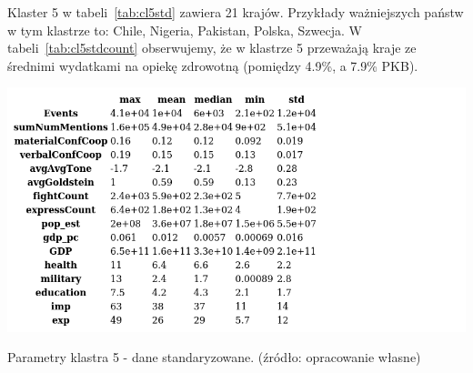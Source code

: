 \documentclass[11pt]{report}
\begin{document}
    Klaster 5 w tabeli~\ref{tab:cl5std} zawiera 21 krajów.
    Przykłady ważniejszych państw w tym klastrze to: Chile, Nigeria, Pakistan, Polska, Szwecja.
    W tabeli~\ref{tab:cl5stdcount} obserwujemy, że w klastrze 5 przeważają kraje ze średnimi wydatkami na opiekę zdrowotną (pomiędzy 4.9\%, a 7.9\% PKB).

    \begin{table}[!htp]
        \centering
        \includegraphics[width=\linewidth]{tables/CLUST/desc/clust5std_desc.png}
        \caption{Parametry klastra 5 - dane standaryzowane. (źródło: opracowanie własne)}
        \label{tab:cl5std_desc}
    \end{table}
\end{document}
